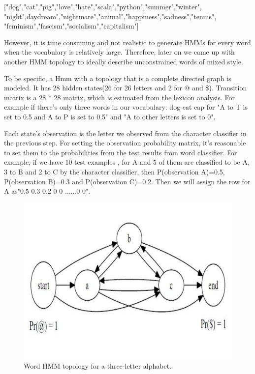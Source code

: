 ["dog","cat","pig","love","hate","scala","python","summer","winter",\\"night",daydream","nightmare","animal","happiness","sadness","tennis",\\"feminism","fascism","socialism","capitalism"]

However, it is time consuming and not realistic to generate HMMs for every word when the vocabulary is relatively large. Therefore, later on we came up with another HMM topology to ideally describe unconstrained words of mixed style.

To be specific, a Hmm  with a topology that is a complete directed graph is modeled. It has 28 hidden states(26 for 26 letters and 2 for @ and \$). 
Transition matrix is a 28 * 28 matrix, which is estimated from the lexicon analysis. For example if there's only three words in our vocabulary: dog cat cap for "A to T is set to 0.5 and A to P is set to 0.5" and "A to other letters is set to 0".

Each state's observation is the letter we observed from the character classifier in the previous step. For setting the observation probability matrix, it's reasonable to set them to the probabilities from the test results from word classifier. For example, if we have 10 test examples , for A and 5 of them are classified to be A, 3 to B and 2 to C by the character classifier, then P(observation A)=0.5, P(observation B)=0.3 and P(observation C)=0.2. Then we will assign the row for A as"0.5 0.3 0.2 0 0 ......0 0".

\begin{figure}[h!]
\centering
\includegraphics[width=5in]{wordtopology}
\caption{Word HMM topology for a three-letter alphabet.}
\label{figure:wordtopology}
\end{figure}

